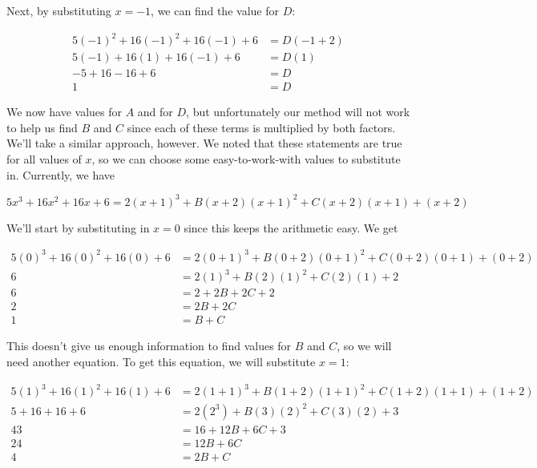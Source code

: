 {Next, by substituting $x=-1$, we can find the value for $D$:

\begin{equation*}
	\begin{split}
		5(-1)^2+16(-1)^2 + 16(-1)+6 & = D(-1+2) \\
		5(-1) + 16(1) + 16(-1) + 6 &= D(1) \\
		-5+16-16+6 & = D \\
		1 & = D
	\end{split}
\end{equation*}

We now have values for $A$ and for $D$, but unfortunately our method will not work to help us find $B$ and $C$ since each of these terms is multiplied by both factors. We'll take a similar approach, however. We noted that these statements are true for all values of $x$, so we can choose some easy-to-work-with values to substitute in. Currently, we have

\begin{equation*}
	5x^3+16x^2+16x+6 = 2(x+1)^3 + B(x+2)(x+1)^2 + C(x+2)(x+1) + (x+2)
\end{equation*}

\noindent
We'll start by substituting in $x=0$ since this keeps the arithmetic easy. We get

\begin{equation*}
	\begin{split}
		5(0)^3 + 16(0)^2 + 16(0) + 6 &= 2(0+1)^3 + B(0+2)(0+1)^2 + C(0+2)(0+1) + (0+2) \\
		6 & = 2(1)^3 + B(2)(1)^2 + C(2)(1) + 2 \\
		6 & = 2 +2B + 2C + 2 \\
		2 &= 2B + 2C \\
		1 & = B + C
	\end{split}
\end{equation*}

This doesn't give us enough information to find values for $B$ and $C$, so we will need another equation. To get this equation, we will substitute $x=1$:

\begin{equation*}
	\begin{split}
		5(1)^3 + 16(1)^2 + 16(1) + 6 & = 2(1+1)^3 + B(1+2)(1+1)^2 + C(1+2)(1+1) + (1+2) \\
		5+16+16+6 & = 2(2^3) + B(3)(2)^2 + C(3)(2) + 3 \\
		43 & = 16 + 12B + 6C + 3 \\
		24 & = 12B + 6C \\
		4 & = 2B + C
	\end{split}
\end{equation*}

}
